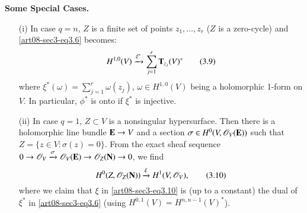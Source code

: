 \medskip
\noindent
{\bf Some Special Cases.}
\begin{itemize}
\item[(i)] In case $q=n$, $Z$ is a finite set of points $z_{1},\ldots,z_{r}$ ($Z$ is a zero-cycle) and \eqref{art08-sec3-eq3.6} becomes:
\begin{equation*}
H^{1,0}(V)\xrightarrow{\xi^{*}}\sum\limits^{r}_{j=1}\mathbf{T}_{z_{j}}(V)^{*}\tag{3.9}\label{art08-sec3-eq3.9}
\end{equation*}
where $\xi^{*}(\omega)=\sum\limits^{r}_{j=1}\omega(z_{j})$, $\omega\in H^{1,0}(V)$ being a holomorphic 1-form on $V$. In particular, $\phi^{*}$ is onto if $\xi^{*}$ is injective.

\item[(ii)] In case $q=1$, $Z\subset V$ is a nonsingular hypersurface. Then there is a holomorphic line bundle $\mathbf{E}\to V$ and a section $\sigma\in H^{0}(V,\mathscr{O}_{V}(\mathbf{E}))$ such that $Z=\{z\in V:\sigma(z)=0\}$. From the exact sheaf sequence $0\to \mathscr{O}_{V}\xrightarrow{\sigma}\mathscr{O}_{V}(\mathbf{E})\to \mathscr{O}_{Z}(\mathbf{N})\to 0$, we find
\begin{equation*}
H^{0}(Z,\mathscr{O}_{Z}(\mathbf{N}))\xrightarrow{\xi}H^{1}(V,\mathscr{O}_{V}),\tag{3.10}\label{art08-sec3-eq3.10}
\end{equation*}
where we claim that $\xi$ in \eqref{art08-sec3-eq3.10} is (up to a constant) the dual of $\xi^{*}$ in \eqref{art08-sec3-eq3.6} (using $H^{0,1}(V)=H^{n,n-1}(V)^{*}$).
\end{itemize}


